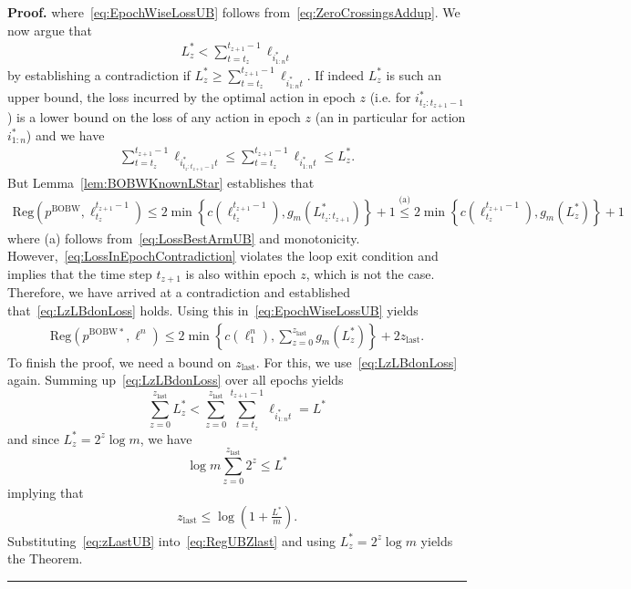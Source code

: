 \documentclass[11pt,letter]{article}
\newenvironment{proof}[1][Proof]{\noindent\textbf{#1.} }{\ \rule{0.5em}{0.5em}}
\newcommand{\Reg}{\mathrm{Reg}}
\newcommand{\pbobw}{p^{\mathrm{BOBW}}}
\newcommand{\zlast}{z_{\mathrm{last}}}
\newcommand{\pstar}{p^{\mathrm{BOBW*}}}
\begin{document}
\begin{proof}
    where~\eqref{eq:EpochWiseLossUB} follows from~\eqref{eq:ZeroCrossingsAddup}. We now argue that 
    \begin{align}\label{eq:LzLBdonLoss}
        L^*_{z} < \sum_{t=t_z}^{t_{z+1}-1} \ell_{i^*_{1:n}t}
    \end{align}
    by establishing a contradiction if $L^*_{z} \ge \sum_{t=t_z}^{t_{z+1}-1} \ell_{i^*_{1:n}t}$. If indeed $L^*_z$ is such an upper bound, the loss incurred by the optimal action in epoch $z$ (i.e. for $i^*_{t_z:t_{z+1}-1}$) is a lower bound on the loss of any action in epoch $z$ (an in particular for action $i^*_{1:n}$) and we have 
    \begin{align}\label{eq:LossBestArmUB}
    \sum_{t=t_z}^{t_{z+1}-1} \ell_{i^*_{t_z:t_{z+1}-1}t} \le \sum_{t=t_z}^{t_{z+1}-1} \ell_{i^*_{1:n}t} \le L^*_z.  
     \end{align}
    But Lemma~\ref{lem:BOBWKnownLStar} establishes that
    \begin{align}\label{eq:LossInEpochContradiction}
    \Reg(\pbobw, \ell_{t_z}^{t_{z+1}-1}) \le 2\min\left\{c(\ell_{t_z}^{t_{z+1}-1}), g_m(L^*_{t_{z}:t_{z+1}})\right\} + 1 \stackrel{\text{(a)}}{\le} 2\min\left\{c(\ell_{t_z}^{t_{z+1}-1}), g_m(L^*_z)\right\} + 1
    \end{align}
    where (a) follows from~\eqref{eq:LossBestArmUB} and monotonicity. However,~\eqref{eq:LossInEpochContradiction} violates the loop exit condition and implies that the time step $t_{z+1}$ is also within epoch $z$, which is not the case. Therefore, we have arrived at a contradiction and established that~\eqref{eq:LzLBdonLoss} holds. Using this in~\eqref{eq:EpochWiseLossUB} yields 
    \begin{align}\label{eq:RegUBZlast}
        \Reg(\pstar,\ell^n) \le  2 \min\left\{c(\ell_{1}^{n}),  \sum_{z=0}^{\zlast} g_m(L_z^*)\right\} + 2\zlast. 
    \end{align}
    To finish the proof, we need a bound on $\zlast$. For this, we use~\eqref{eq:LzLBdonLoss} again. Summing up~\eqref{eq:LzLBdonLoss} over all epochs yields 
    \[
        \sum_{z=0}^{\zlast} L^*_z < \sum_{z=0}^{\zlast} \sum_{t=t_z}^{t_{z+1}-1} \ell_{i^*_{1:n}t} = L^*
    \]
    and since $L^*_z = 2^z \log m$, we have 
    \[
    \log m \sum_{z=0}^{\zlast} 2^z \le L^* 
    \]
    implying that 
    \begin{align} \label{eq:zLastUB}
       \zlast \le \log\left(1+\frac{L^*}{m}\right).
    \end{align}
    Substituting~\eqref{eq:zLastUB} into~\eqref{eq:RegUBZlast} and using $L_z^* = 2^z \log m$ yields the Theorem.
\end{proof}
\end{document}
